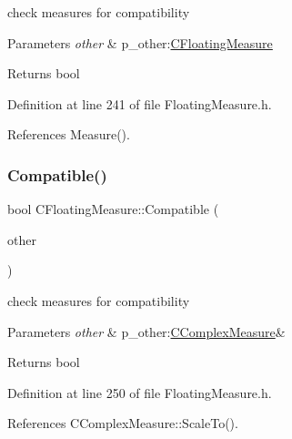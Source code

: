 check measures for compatibility 


\begin{DoxyParams}{Parameters}
{\em other} & p\+\_\+other\+:\hyperlink{classCFloatingMeasure}{C\+Floating\+Measure}\\
\hline
\end{DoxyParams}
\begin{DoxyReturn}{Returns}
bool 
\end{DoxyReturn}


Definition at line 241 of file Floating\+Measure.\+h.



References Measure().

\mbox{\label{classCFloatingMeasure_a5cf69c287abe4e2f65242e97093f7595}} 
\subsubsection{\texorpdfstring{Compatible()}{Compatible()}\hspace{0.1cm}{\footnotesize\ttfamily [2/2]}}
{\footnotesize\ttfamily bool C\+Floating\+Measure\+::\+Compatible (\begin{DoxyParamCaption}\item[{const \hyperlink{classCComplexMeasure}{C\+Complex\+Measure} \&}]{other }\end{DoxyParamCaption})\hspace{0.3cm}{\ttfamily [inline]}}



check measures for compatibility 


\begin{DoxyParams}{Parameters}
{\em other} & p\+\_\+other\+:\hyperlink{classCComplexMeasure}{C\+Complex\+Measure}\&\\
\hline
\end{DoxyParams}
\begin{DoxyReturn}{Returns}
bool 
\end{DoxyReturn}


Definition at line 250 of file Floating\+Measure.\+h.



References C\+Complex\+Measure\+::\+Scale\+To().

\mbox{\label{classCFloatingMeasure_a6d92f39204f23e81732cb77131517b6f}} 

